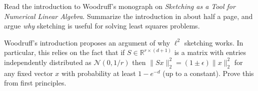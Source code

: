 \documentclass[12pt,letterpaper,cm]{hmcpset}
\begin{document}
\begin{problem}[1]
    Read the introduction to Woodruff's monograph on \emph{Sketching as a Tool
    for Numerical Linear Algebra}. Summarize the introduction in about half a page,
    and argue \emph{why} sketching is useful for solving least squares problems.
\end{problem}

\begin{solution}
    \vfill
\end{solution}

\begin{problem}[2]
    Woodruff's introduction proposes an argument of why $\ell^2$ sketching works.
    In particular, this relies on the fact that if $S\in\mathbb{R}^{r\times (d+1)}$
    is a matrix with entries independently distributed as $\mathcal{N}(0,1/r)$ then
    $\|Sx\|_2^2 = (1\pm\epsilon)\|x\|_2^2$ for any fixed vector $x$ with probability
    at least $1 - e^{-d}$ (up to a constant). Prove this from first principles.
\end{problem}

\begin{solution}
    \vfill
\end{solution}
\clearpage
\end{document}
